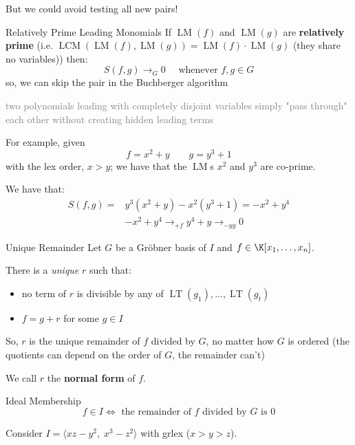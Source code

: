 \documentclass[a4paper, 11pt]{report}
\newcommand{\LT}{\operatorname{LT}}
\newcommand{\LM}{\operatorname{LM}}
\newcommand{\LCM}{\operatorname{LCM}}
\begin{document}
But we could avoid testing all new pairs!

\begin{propframe}{Relatively Prime Leading Monomials}{}
    If $\LM(f)$ and $\LM(g)$ are \textbf{relatively prime} (i.e. $\LCM(\LM(f), \LM(g)) = \LM(f) \cdot \LM(g)$ (they share no variables)) then:
    $$ S(f,g) \to_{G} 0 \quad \text{ whenever } f,g \in G $$
    so, we can skip the pair in the Buchberger algorithm

    \textcolor{gray}{two polynomials leading with completely disjoint variables simply "pass through" each other without creating hidden leading terms}
\end{propframe}

For example, given
$$ f = x^{2} + y \quad \quad g = y^{3} + 1 $$
with the lex order, $x > y$; we have that the $\LM$s $x^{2}$ and $y^{3}$ are co-prime.

We have that:
\begin{align*}
    S(f,g) = & y^{3}(x^{2}+y)-x^{2}(y^{3}+1) = -x^{2}+y^{4}  \\
             & -x^{2}+y^{4} \to_{+f} y^{4}+y \to_{-y g}0 
\end{align*}

\begin{thmframe}{Unique Remainder}{}
    Let $G$ be a Gr\"obner basis of $I$ and $f \in \K[x_1, \dots , x_{n}]$.

    There is a \textit{unique} $r$ such that:
    \begin{itemize}
        \item no term of $r$ is divisible by any of $\LT(g_1), \dots , \LT(g_{t})$
        \item $f = g+r$ for some $g \in I$
    \end{itemize}

    So, $r$ is the unique remainder of $f$ divided by $G$, no matter how $G$ is ordered (the quotients can depend on the order of $G$, the remainder can't)
\end{thmframe}

We call $r$ the \textbf{normal form} of $f$.

\begin{corframe}{Ideal Membership}
    \vspace{-1em}
    $$ f \in I \iff \text{ the remainder of } f \text{ divided by } G \text{ is } 0  $$
\end{corframe}

Consider $I = \langle xz - y^2,\; x^3 - z^2 \rangle$ with grlex ($x > y > z$).
\end{document}
